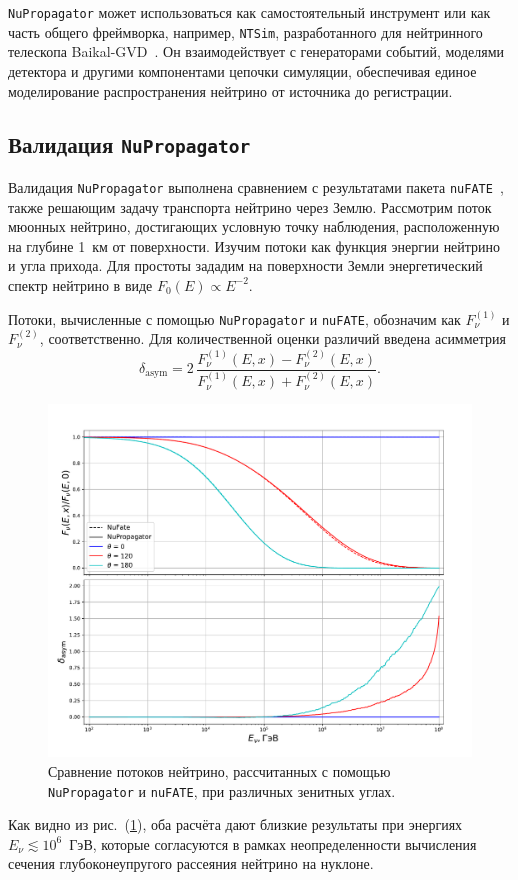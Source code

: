 \texttt{NuPropagator} может использоваться как самостоятельный инструмент или как часть общего фреймворка, например, \texttt{NTSim}, разработанного для нейтринного телескопа Baikal-GVD~\cite{ntsim2025}. 
Он взаимодействует с генераторами событий, моделями детектора и другими компонентами цепочки симуляции, обеспечивая единое моделирование распространения нейтрино от источника до регистрации.

\subsection{Валидация \texttt{NuPropagator}}
Валидация \texttt{NuPropagator} выполнена сравнением с результатами  пакета \texttt{nuFATE}~\cite{Vincent_2017}, также решающим задачу транспорта нейтрино через Землю. Рассмотрим поток мюонных нейтрино, достигающих условную точку наблюдения,  расположенную на глубине 1~км от поверхности. Изучим потоки как функция энергии нейтрино и угла прихода. Для простоты зададим на поверхности Земли энергетический спектр  нейтрино в виде $F_0(E) \propto E^{-2}$.  

Потоки, вычисленные с помощью \texttt{NuPropagator} и \texttt{nuFATE}, обозначим как $F_\nu^{(1)}$ и $F_\nu^{(2)}$, соответственно. 
Для количественной оценки различий введена асимметрия
\begin{equation}
\delta_{\text{asym}} = 
2\,\frac{F_\nu^{(1)}(E, x) - F_\nu^{(2)}(E, x)}
       {F_\nu^{(1)}(E, x) + F_\nu^{(2)}(E, x)}.
\end{equation}

\begin{figure}[!h]
\centering
\includegraphics[width=0.8\linewidth]{images/NuProp/compNuandNu.pdf}
\caption{Сравнение потоков нейтрино, рассчитанных с помощью \texttt{NuPropagator} и \texttt{nuFATE}, при различных зенитных углах.}
\label{fig:flux_compare}
\end{figure}

Как видно из рис.~(\ref{fig:flux_compare}), оба расчёта дают близкие результаты при энергиях $E_\nu \lesssim 10^6$~ГэВ, которые согласуются в рамках неопределенности вычисления сечения глубоконеупругого рассеяния нейтрино на нуклоне. 
